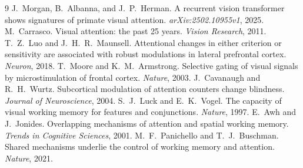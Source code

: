 \documentclass[11pt]{article}
\begin{document}
\begin{thebibliography}{9}
\small
{} J.~Morgan, B.~Albanna, and J.~P.~Herman. A recurrent vision transformer shows signatures of primate visual attention. \emph{arXiv:2502.10955v1}, 2025.
 M.~Carrasco. Visual attention: the past 25 years. \emph{Vision Research}, 2011.
 T.~Z.~Luo and J.~H.~R.~Maunsell. Attentional changes in either criterion or sensitivity are associated with robust modulations in lateral prefrontal cortex. \emph{Neuron}, 2018.
 T.~Moore and K.~M.~Armstrong. Selective gating of visual signals by microstimulation of frontal cortex. \emph{Nature}, 2003.
 J.~Cavanaugh and R.~H.~Wurtz. Subcortical modulation of attention counters change blindness. \emph{Journal of Neuroscience}, 2004.
 S.~J.~Luck and E.~K.~Vogel. The capacity of visual working memory for features and conjunctions. \emph{Nature}, 1997.
 E.~Awh and J.~Jonides. Overlapping mechanisms of attention and spatial working memory. \emph{Trends in Cognitive Sciences}, 2001.
 M.~F.~Panichello and T.~J.~Buschman. Shared mechanisms underlie the control of working memory and attention. \emph{Nature}, 2021.
\end{thebibliography}
\end{document}
